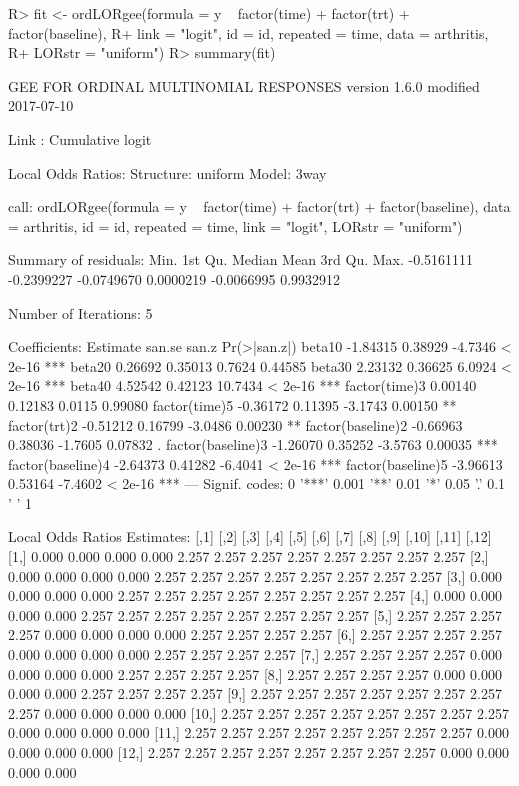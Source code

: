\documentclass[
]{jss}
\begin{document}
\begin{CodeChunk}

\begin{CodeInput}
R>  fit <- ordLORgee(formula = y ~ factor(time) + factor(trt) + factor(baseline),
R+         link = "logit", id = id, repeated = time, data = arthritis,
R+         LORstr = "uniform")
R>  summary(fit)
\end{CodeInput}

\begin{CodeOutput}
GEE FOR ORDINAL MULTINOMIAL RESPONSES 
version 1.6.0 modified 2017-07-10 

Link : Cumulative logit 

Local Odds Ratios:
Structure:         uniform
Model:             3way

call:
ordLORgee(formula = y ~ factor(time) + factor(trt) + factor(baseline), 
    data = arthritis, id = id, repeated = time, link = "logit", 
    LORstr = "uniform")

Summary of residuals:
      Min.    1st Qu.     Median       Mean    3rd Qu.       Max. 
-0.5161111 -0.2399227 -0.0749670  0.0000219 -0.0066995  0.9932912 

Number of Iterations: 5 

Coefficients:
                  Estimate   san.se   san.z Pr(>|san.z|)    
beta10            -1.84315  0.38929 -4.7346      < 2e-16 ***
beta20             0.26692  0.35013  0.7624      0.44585    
beta30             2.23132  0.36625  6.0924      < 2e-16 ***
beta40             4.52542  0.42123 10.7434      < 2e-16 ***
factor(time)3      0.00140  0.12183  0.0115      0.99080    
factor(time)5     -0.36172  0.11395 -3.1743      0.00150 ** 
factor(trt)2      -0.51212  0.16799 -3.0486      0.00230 ** 
factor(baseline)2 -0.66963  0.38036 -1.7605      0.07832 .  
factor(baseline)3 -1.26070  0.35252 -3.5763      0.00035 ***
factor(baseline)4 -2.64373  0.41282 -6.4041      < 2e-16 ***
factor(baseline)5 -3.96613  0.53164 -7.4602      < 2e-16 ***
---
Signif. codes:  0 '***' 0.001 '**' 0.01 '*' 0.05 '.' 0.1 ' ' 1

Local Odds Ratios Estimates:
       [,1]  [,2]  [,3]  [,4]  [,5]  [,6]  [,7]  [,8]  [,9] [,10] [,11] [,12]
 [1,] 0.000 0.000 0.000 0.000 2.257 2.257 2.257 2.257 2.257 2.257 2.257 2.257
 [2,] 0.000 0.000 0.000 0.000 2.257 2.257 2.257 2.257 2.257 2.257 2.257 2.257
 [3,] 0.000 0.000 0.000 0.000 2.257 2.257 2.257 2.257 2.257 2.257 2.257 2.257
 [4,] 0.000 0.000 0.000 0.000 2.257 2.257 2.257 2.257 2.257 2.257 2.257 2.257
 [5,] 2.257 2.257 2.257 2.257 0.000 0.000 0.000 0.000 2.257 2.257 2.257 2.257
 [6,] 2.257 2.257 2.257 2.257 0.000 0.000 0.000 0.000 2.257 2.257 2.257 2.257
 [7,] 2.257 2.257 2.257 2.257 0.000 0.000 0.000 0.000 2.257 2.257 2.257 2.257
 [8,] 2.257 2.257 2.257 2.257 0.000 0.000 0.000 0.000 2.257 2.257 2.257 2.257
 [9,] 2.257 2.257 2.257 2.257 2.257 2.257 2.257 2.257 0.000 0.000 0.000 0.000
[10,] 2.257 2.257 2.257 2.257 2.257 2.257 2.257 2.257 0.000 0.000 0.000 0.000
[11,] 2.257 2.257 2.257 2.257 2.257 2.257 2.257 2.257 0.000 0.000 0.000 0.000
[12,] 2.257 2.257 2.257 2.257 2.257 2.257 2.257 2.257 0.000 0.000 0.000 0.000


\end{CodeOutput}
\end{CodeChunk}
\end{document}
